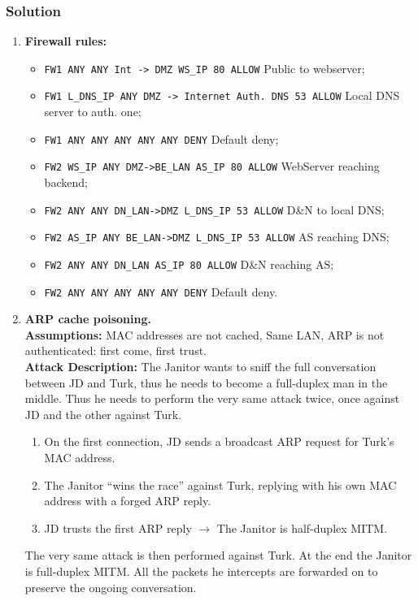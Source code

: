 \documentclass{article}
\begin{document}
\subsubsection*{Solution}
\begin{enumerate}
    \item[\textbf{5.1}] \textbf{Firewall rules:}
    \begin{itemize}
        \item \texttt{FW1 ANY ANY Int -> DMZ WS\_IP 80 ALLOW} Public to webserver;
        \item \texttt{FW1 L\_DNS\_IP ANY DMZ -> Internet Auth. DNS 53 ALLOW} Local DNS server to auth. one;
        \item \texttt{FW1 ANY ANY ANY ANY ANY DENY} Default deny;
        \item \texttt{FW2 WS\_IP ANY DMZ->BE\_LAN AS\_IP 80 ALLOW} WebServer reaching backend;
        \item \texttt{FW2 ANY ANY DN\_LAN->DMZ L\_DNS\_IP 53 ALLOW} D\&N to local DNS;
        \item \texttt{FW2 AS\_IP ANY BE\_LAN->DMZ L\_DNS\_IP 53 ALLOW} AS reaching DNS;
        \item \texttt{FW2 ANY ANY DN\_LAN AS\_IP 80 ALLOW} D\&N reaching AS;
        \item \texttt{FW2 ANY ANY ANY ANY ANY DENY} Default deny.
    \end{itemize}

    \item[\textbf{5.2}] \textbf{ARP cache poisoning.} \\
    \textbf{Assumptions:} MAC addresses are not cached, Same LAN, ARP is not authenticated: first come, first trust. \\
    \textbf{Attack Description:} The Janitor wants to sniff the full conversation between JD and Turk, thus he needs to become a full-duplex man in the middle. Thus he needs to perform the very same attack twice, once against JD and the other against Turk. 
    \begin{enumerate}
        \item On the first connection, JD sends a broadcast ARP request for Turk's MAC address. 
        \item The Janitor ``wins the race'' against Turk, replying with his own MAC address with a forged ARP reply. 
        \item JD trusts the first ARP reply $\rightarrow$ The Janitor is half-duplex MITM. 
    \end{enumerate}
    The very same attack is then performed against Turk. At the end the Janitor is full-duplex MITM. All the packets he intercepts are forwarded on to preserve the ongoing conversation.


\end{enumerate}
\end{document}
